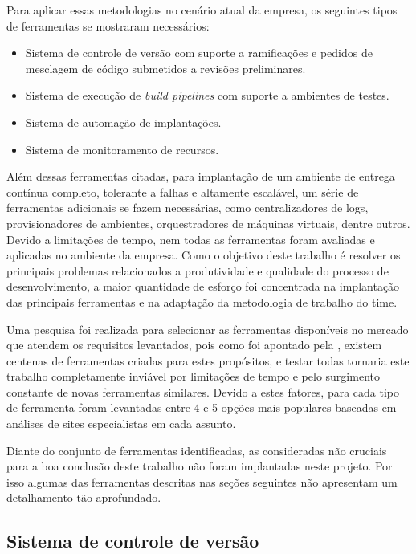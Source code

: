 \documentclass[
	12pt,				%
	openright,			%
	oneside,			%
	a4paper,			%
	english,			%
	french,				%
	spanish,			%
	brazil,				%
	]{abntex2}
\begin{document}
Para aplicar essas metodologias no cenário atual da empresa, os seguintes tipos de ferramentas se mostraram necessários:

\begin{itemize}
	\item Sistema de controle de versão com suporte a ramificações e pedidos de mesclagem de código submetidos a revisões preliminares.
	\item Sistema de execução de \textit{build pipelines} com suporte a ambientes de testes.
	\item Sistema de automação de implantações.
	\item Sistema de monitoramento de recursos.
\end{itemize}

Além dessas ferramentas citadas, para implantação de um ambiente de entrega contínua completo, tolerante a falhas e altamente escalável, um série de ferramentas adicionais se fazem necessárias, como centralizadores de logs, provisionadores de ambientes, orquestradores de máquinas virtuais, dentre outros. Devido a limitações de tempo, nem todas as ferramentas foram avaliadas e aplicadas no ambiente da empresa. Como o objetivo deste trabalho é resolver os principais problemas relacionados a produtividade e qualidade do processo de desenvolvimento, a maior quantidade de esforço foi concentrada na implantação das principais ferramentas e na adaptação da metodologia de trabalho do time.

Uma pesquisa foi realizada para selecionar as ferramentas disponíveis no mercado que atendem os requisitos levantados, pois como foi apontado pela , existem centenas de ferramentas criadas para estes propósitos, e testar todas tornaria este trabalho completamente inviável por limitações de tempo e pelo surgimento constante de novas ferramentas similares. Devido a estes fatores, para cada tipo de ferramenta foram levantadas entre 4 e 5 opções mais populares baseadas em análises de sites especialistas em cada assunto.

Diante do conjunto de ferramentas identificadas, as consideradas não cruciais para a boa conclusão deste trabalho não foram implantadas neste projeto. Por isso algumas das ferramentas descritas nas seções seguintes não apresentam um detalhamento tão aprofundado.

\subsection{Sistema de controle de versão}
\end{document}
